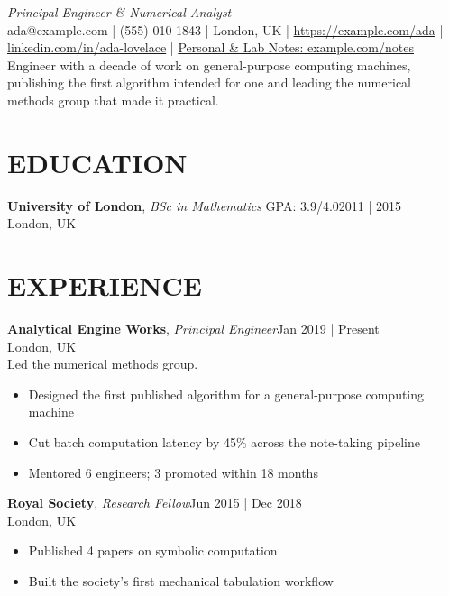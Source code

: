 \documentclass[line,margin]{res}
\begin{document}
      \begin{resume}
        \vspace{-5mm}
        {\large \sl Principal Engineer \& Numerical Analyst}\\[2pt]
ada@example.com | (555) 010-1843 | London, UK | \href{https://example.com/ada}{https://example.\allowbreak{}com/\allowbreak{}ada} | \href{https://linkedin.com/in/ada-lovelace}{linkedin.\allowbreak{}com/\allowbreak{}in/\allowbreak{}ada-\allowbreak{}lovelace} | \href{https://example.com/notes}{Personal \& Lab Notes: example.\allowbreak{}com/\allowbreak{}notes}\\[2pt]
Engineer with a decade of work on general-purpose computing machines, publishing the first algorithm intended for one and leading the numerical methods group that made it practical.
\vspace{2mm}
        
\vspace{3pt}
\section{EDUCATION}
\textbf{University of London}, {\sl BSc in Mathematics} GPA: 3.9/4.0\hfill 2011 | 2015\\London, UK
\vspace{3pt}
      \section{EXPERIENCE}
      \textbf{Analytical Engine Works}, {\sl Principal Engineer}\hfill Jan 2019 | Present\\London, UK\\Led the numerical methods group.\\\begin{itemize} \itemsep 2pt
\item Designed the first published algorithm for a general-purpose computing machine
\item Cut batch computation latency by 45\% across the note-taking pipeline
\item Mentored 6 engineers; 3 promoted within 18 months
\end{itemize}
      \textbf{Royal Society}, {\sl Research Fellow}\hfill Jun 2015 | Dec 2018\\London, UK\\\begin{itemize} \itemsep 2pt
\item Published 4 papers on symbolic computation
\item Built the society's first mechanical tabulation workflow
\end{itemize}
\vspace{3pt}

\end{resume}
\end{document}
